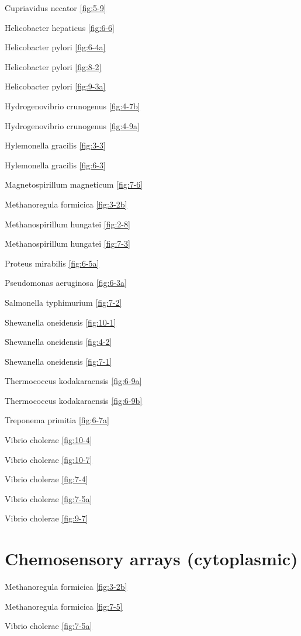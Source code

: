 \documentclass[]{tufte-book}
\begin{document}
Cupriavidus necator \ref{fig:5-9}

Helicobacter hepaticus \ref{fig:6-6}

Helicobacter pylori \ref{fig:6-4a}

Helicobacter pylori \ref{fig:8-2}

Helicobacter pylori \ref{fig:9-3a}

Hydrogenovibrio crunogenus \ref{fig:4-7b}

Hydrogenovibrio crunogenus \ref{fig:4-9a}

Hylemonella gracilis \ref{fig:3-3}

Hylemonella gracilis \ref{fig:6-3}

Magnetospirillum magneticum \ref{fig:7-6}

Methanoregula formicica \ref{fig:3-2b}

Methanospirillum hungatei \ref{fig:2-8}

Methanospirillum hungatei \ref{fig:7-3}

Proteus mirabilis \ref{fig:6-5a}

Pseudomonas aeruginosa \ref{fig:6-3a}

Salmonella typhimurium \ref{fig:7-2}

Shewanella oneidensis \ref{fig:10-1}

Shewanella oneidensis \ref{fig:4-2}

Shewanella oneidensis \ref{fig:7-1}

Thermococcus kodakaraensis \ref{fig:6-9a}

Thermococcus kodakaraensis \ref{fig:6-9b}

Treponema primitia \ref{fig:6-7a}

Vibrio cholerae \ref{fig:10-4}

Vibrio cholerae \ref{fig:10-7}

Vibrio cholerae \ref{fig:7-4}

Vibrio cholerae \ref{fig:7-5a}

Vibrio cholerae \ref{fig:9-7}

\section*{Chemosensory arrays
(cytoplasmic)}\label{chemosensory-arrays-cytoplasmic}

Methanoregula formicica \ref{fig:3-2b}

Methanoregula formicica \ref{fig:7-5}

Vibrio cholerae \ref{fig:7-5a}
\end{document}
